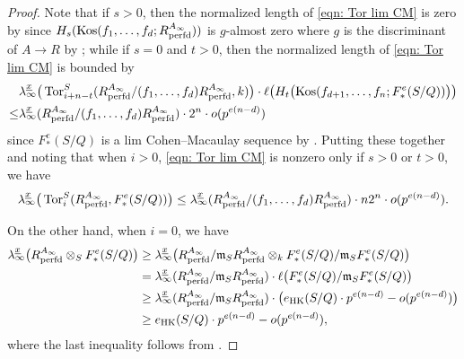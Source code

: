 \documentclass[12pt]{amsart}
\numberwithin{equation}{theorem}
\numberwithin{equation}{theorem}
\renewcommand{\m}{\mathfrak{m}}
\newcommand{\perfd}{\textnormal{perfd}}
\newcommand{\Kos}{\textnormal{Kos}}
\begin{document}
\begin{proof}
Note that if $s>0$, then the normalized length of \autoref{eqn: Tor lim CM} is zero by \cite[Proposition 4.0.10]{CaiLeeMaSchwedeTuckerPerfdSignature2026} since $H_s(\Kos(f_1,\dots,f_d; R^{A_\infty}_\perfd))$ is $g$-almost zero where $g$ is the discriminant of $A\to R$ by \cite[Corollary 4.0.4]{CaiLeeMaSchwedeTuckerPerfdSignature2026}; while if $s=0$ and $t>0$, then the normalized length of \autoref{eqn: Tor lim CM} is bounded by 
\begin{align*}
& \lambda_\infty^{\underline{x}}\big(\Tor_{i+n-t}^S(R^{A_\infty}_\perfd/(f_1,\dots,f_d)R^{A_\infty}_\perfd, k)\big)\cdot \ell\big(H_t\big(\Kos(f_{d+1},\dots, f_n; F^e_*(S/Q))\big)\big)  \\
\leq & \lambda_\infty^{\underline{x}}(R^{A_\infty}_\perfd/(f_1,\dots,f_d)R^{A_\infty}_\perfd)\cdot 2^n \cdot o(p^{e(n-d)})   
\end{align*}
since $F^e_*(S/Q)$ is a lim Cohen--Macaulay sequence by \cite[Theorem 5.4]{BhattHochsterMaLimCM2026}. Putting these together and noting that when $i>0$, \autoref{eqn: Tor lim CM} is nonzero only if $s>0$ or $t>0$, we have 
\begin{equation}
\label{eqn: eqn 1 in char p proof}
\lambda_\infty^{\underline{x}}\big(\Tor_i^S(R^{A_\infty}_\perfd, F^e_*(S/Q))\big)\leq \lambda_\infty^{\underline{x}}(R^{A_\infty}_\perfd/(f_1,\dots,f_d)R^{A_\infty}_\perfd)\cdot n2^n \cdot o(p^{e(n-d)}).
\end{equation}

On the other hand, when $i=0$, we have 
\begin{align}
\label{eqn: eqn 2 in char p proof}
\lambda_\infty^{\underline{x}}\big(R^{A_\infty}_\perfd \otimes_S F^e_*(S/Q)\big) & \geq \lambda_\infty^{\underline{x}}\big(R^{A_\infty}_\perfd/\m_SR^{A_\infty}_\perfd \otimes_k F^e_*(S/Q)/\m_SF^e_*(S/Q)\big) \\
& = \lambda_\infty^{\underline{x}}(R^{A_\infty}_\perfd/\m_SR^{A_\infty}_\perfd) \cdot \ell\big(F^e_*(S/Q)/\m_SF^e_*(S/Q)\big) \notag \\
& \geq \lambda_\infty^{\underline{x}}(R^{A_\infty}_\perfd/\m_SR^{A_\infty}_\perfd) \cdot \big(e_{\text{HK}}(S/Q)\cdot p^{e(n-d)} - o(p^{e(n-d)})\big) \notag \\
& \geq e_{\text{HK}}(S/Q)\cdot p^{e(n-d)} - o(p^{e(n-d)}), \notag
\end{align}
where the last inequality follows from \cite[Proposition 4.0.20]{CaiLeeMaSchwedeTuckerPerfdSignature2026}.


\end{proof}
\end{document}

